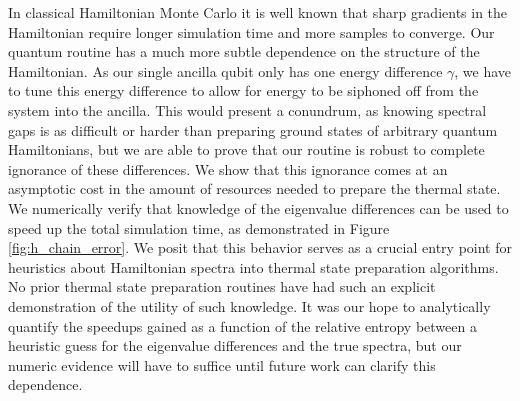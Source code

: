 \documentclass[
 amsmath,amssymb,
 aps,
onecolumn, 
nofootinbib]{revtex4-2}
\begin{document}
In classical Hamiltonian Monte Carlo it is well known that sharp gradients in the Hamiltonian require longer simulation time and more samples to converge. Our quantum routine has a much more subtle dependence on the structure of the Hamiltonian. As our single ancilla qubit only has one energy difference $\gamma$, we have to tune this energy difference to allow for energy to be siphoned off from the system into the ancilla. This would present a conundrum, as knowing spectral gaps is as difficult or harder than preparing ground states of arbitrary quantum Hamiltonians, but we are able to prove that our routine is robust to complete ignorance of these differences. We show that this ignorance comes at an asymptotic cost in the amount of resources needed to prepare the thermal state. We numerically verify that knowledge of the eigenvalue differences can be used to speed up the total simulation time, as demonstrated in Figure \ref{fig:h_chain_error}. We posit that this behavior serves as a crucial entry point for heuristics about Hamiltonian spectra into thermal state preparation algorithms. No prior thermal state preparation routines have had such an explicit demonstration of the utility of such knowledge. It was our hope to analytically quantify the speedups gained as a function of the relative entropy between a heuristic guess for the eigenvalue differences and the true spectra, but our numeric evidence will have to suffice until future work can clarify this dependence.
\end{document}
